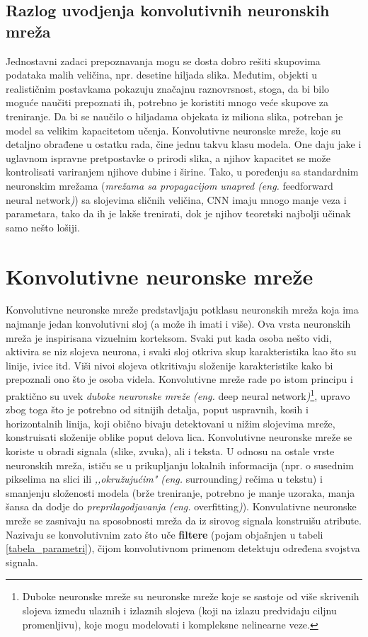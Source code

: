 \documentclass[a4paper]{article}
\begin{document}
\subsection{Razlog uvodjenja konvolutivnih neuronskih mreža}

Jednostavni zadaci prepoznavanja mogu se dosta dobro rešiti skupovima podataka malih veličina, npr. desetine hiljada slika. Međutim, objekti u realističnim postavkama pokazuju značajnu raznovrsnost, stoga, da bi bilo moguće naučiti prepoznati ih, potrebno je koristiti mnogo veće skupove za treniranje. Da bi se naučilo o hiljadama objekata iz miliona slika, potreban je model sa velikim kapacitetom učenja. Konvolutivne neuronske mreže, koje su detaljno obrađene u ostatku rada, čine jednu takvu klasu modela. One daju jake i uglavnom ispravne pretpostavke o prirodi slika, a njihov kapacitet se može kontrolisati variranjem njihove dubine i širine. Tako, u poređenju sa standardnim neuronskim mrežama (\textit{mrežama sa propagacijom unapred (eng.} feedforward neural network\textit{)}) sa slojevima sličnih veličina, CNN imaju mnogo manje veza i parametara, tako da ih je lakše trenirati, dok je njihov teoretski najbolji učinak samo nešto lošiji.


\section{Konvolutivne neuronske mreže}	
\label{sec:cnn}

Konvolutivne neuronske mreže predstavljaju potklasu neuronskih mreža koja ima najmanje jedan konvolutivni sloj (a može ih imati i više). Ova vrsta neuronskih mreža je inspirisana vizuelnim korteksom. Svaki put kada osoba nešto vidi, aktivira se niz slojeva neurona, i svaki sloj otkriva skup karakteristika kao što su linije, ivice itd. Viši nivoi slojeva otkritivaju složenije karakteristike kako bi prepoznali ono što je osoba videla. Konvolutivne mreže rade po istom principu i praktično su uvek \textit{duboke neuronske mreže (eng.} deep neural network\textit{)}\footnote{Duboke neuronske mreže su neuronske mreže koje se sastoje od više skrivenih slojeva između ulaznih i izlaznih slojeva (koji na izlazu predviđaju ciljnu promenljivu), koje mogu modelovati i kompleksne nelinearne veze.}, upravo zbog toga što je potrebno od sitnijih detalja, poput uspravnih, kosih i horizontalnih linija, koji obično bivaju detektovani u nižim slojevima mreže, konstruisati složenije oblike poput delova lica. Konvolutivne neuronske mreže se koriste u obradi signala (slike, zvuka), ali i teksta. U odnosu na ostale vrste neuronskih mreža, ističu se u prikupljanju lokalnih informacija (npr. o susednim pikselima na slici ili \textit{,,okružujućim" (eng.} surrounding\textit{)} rečima u tekstu) i smanjenju složenosti modela (brže treniranje, potrebno je manje uzoraka, manja šansa da dodje do \textit{preprilagodjavanja (eng.} overfitting\textit{)}). Konvulativne neuronske mreže se zasnivaju na sposobnosti mreža da iz sirovog signala konstruišu atribute. Nazivaju se konvolutivnim zato što uče \textbf{filtere} (pojam objašnjen u tabeli \ref{tabela_parametri}), čijom konvolutivnom primenom detektuju određena svojstva signala.
\end{document}
